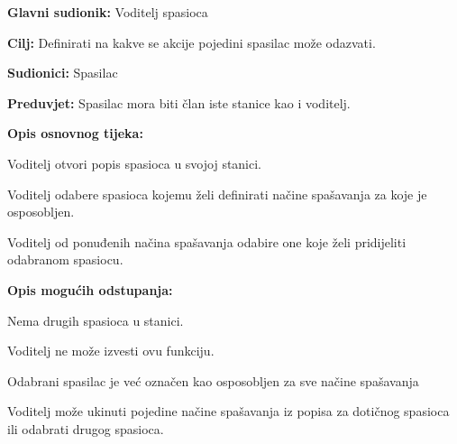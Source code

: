 				\noindent {}
				\begin{packed_item}
					
					\item \textbf{Glavni sudionik: } Voditelj spasioca
					\item  \textbf{Cilj:} Definirati na kakve se akcije pojedini spasilac može odazvati.
					\item  \textbf{Sudionici:} Spasilac
					\item  \textbf{Preduvjet:} Spasilac mora biti član iste stanice kao i voditelj.
					\item  \textbf{Opis osnovnog tijeka:}
					
					\item[] \begin{packed_enum}
						
						\item Voditelj otvori popis spasioca u svojoj stanici.
						\item Voditelj odabere spasioca kojemu želi definirati načine spašavanja za koje je osposobljen.
						\item Voditelj od ponuđenih načina spašavanja odabire one koje želi pridijeliti odabranom spasiocu.
						
					\end{packed_enum}
					
					\item  \textbf{Opis mogućih odstupanja:}
					
					\item[] \begin{packed_item}
						
						\item[1.a] Nema drugih spasioca u stanici.
						\item[] \begin{packed_enum}
							
							\item Voditelj ne može izvesti ovu funkciju.
						\end{packed_enum}
						
						\item[3.a] Odabrani spasilac je već označen kao osposobljen za sve načine spašavanja
						\item[] \begin{packed_enum}
							
							\item Voditelj može ukinuti pojedine načine spašavanja iz popisa za dotičnog spasioca ili odabrati drugog spasioca.				
						\end{packed_enum}
						
						
					\end{packed_item}
					
				\end{packed_item}
